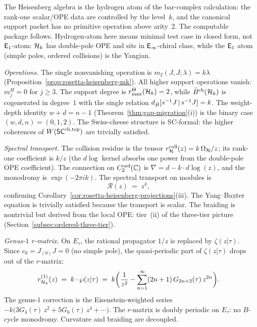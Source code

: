 \begin{computation}%
\label{comp:heisenberg-hydrogen-atom}%
%
%
The Heisenberg algebra is the hydrogen atom of the bar-complex
calculation: the rank-one scalar/OPE data are controlled by the
level~$k$, and the canonical support packet has no primitive operation
above arity~$2$. The computable package follows.
Hydrogen-atom here means minimal test case in closed
form, not $\mathsf{E}_1$-atom: $\mathcal{H}_k$ has double-pole OPE and
sits in $\mathsf{E}_{\infty}$-chiral class, while the $\mathsf{E}_1$ atom (simple
poles, ordered collisions) is the Yangian.

\smallskip
\noindent
\emph{Operations.}
The single nonvanishing operation is
$m_2(J,J;\lambda) = k\lambda$
(Proposition~\ref{prop:rosetta-heisenberg-mk}).
All higher support operations vanish: $m^H_j = 0$ for $j \ge 3$.
The support degree is \(r^\Theta_{\max}(\mathcal{H}_k)=2\), while
$\bar{B}^{\mathrm{ch}}(\mathcal{H}_k)$ is cogenerated in degree~$1$ with the single relation
$d_{\bar{B}}[s^{-1}J\,|\,s^{-1}J] = k$.
The weight-depth identity $w + d = n - 1$
(Theorem~\ref{thm:gap-migration}(i)) is the binary case
$(w,d,n)=(0,1,2)$.
The Swiss-cheese structure is SC-formal: the higher
coherences of $W(\mathsf{SC}^{\mathrm{ch,top}})$ are trivially satisfied.

\smallskip
\noindent
\emph{Spectral transport.}
The collision residue is the tensor
$r^{\mathrm{coll}}_{\mathcal{H}}(z)=k\,\Omega_{\mathcal{H}}/z$; its rank-one
coefficient is $k/z$ (the $d\log$ kernel absorbs one power from the
double-pole OPE coefficient).
The connection on $C_2^{\mathrm{ord}}(\mathbb{C})$ is
$\nabla = d - k \cdot d\log(z)$,
and the monodromy is $\exp(-2\pi i k)$.
The spectral transport on modules is
\begin{equation}\label{eq:heisenberg-hydrogen-R}
\mathcal R(z) \;=\; z^k,
\end{equation}
confirming
Corollary~\ref{cor:rosetta-heisenberg-projections}(iii).
The Yang--Baxter equation is trivially satisfied
because the transport is scalar. The braiding is nontrivial
but derived from the local OPE: tier~(ii) of the
three-tier picture
(Section~\ref{subsec:ordered-three-tier}).

\smallskip
\noindent
\emph{Genus-$1$ $r$-matrix.}
On $E_\tau$, the rational propagator $1/z$ is replaced by
$\zeta(z|\tau)$. Since $c_0 = J_{(0)}J = 0$
(no simple pole), the quasi-periodic part of
$\zeta(z|\tau)$ drops out of the $r$-matrix:
\begin{equation}\label{eq:heisenberg-hydrogen-genus1-r}
r^{(1)}_{\mathcal{H}_k}(z)
\;=\;
k \cdot \wp(z|\tau)
\;=\;
k\biggl(\frac{1}{z^2}
 - \sum_{n=1}^{\infty}(2n+1)\, G_{2n+2}(\tau)\, z^{2n}
\biggr).
\end{equation}
The genus-$1$ correction is the Eisenstein-weighted series
$-k\bigl(3G_4(\tau)\,z^2 + 5G_6(\tau)\,z^4 + \cdots\bigr)$.
The $r$-matrix is doubly periodic on $E_\tau$: no
$B$-cycle monodromy. Curvature and braiding are
decoupled.


\end{computation}

